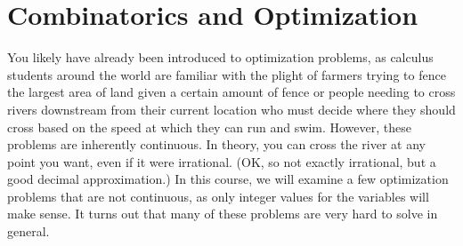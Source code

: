 \section{Combinatorics and Optimization}\label{s:intro:opt}

You likely have already been introduced to optimization problems, as
calculus students around the world are familiar with the plight of
farmers trying to fence the largest area of land given a certain
amount of fence or people needing to cross rivers downstream from
their current location who must decide where they should cross based
on the speed at which they can run and swim. However, these problems
are inherently continuous. In theory, you can cross the river at any
point you want, even if it were irrational. (OK, so not exactly
irrational, but a good decimal approximation.) In this course, we will
examine a few optimization problems that are not continuous, as only
integer values for the variables will make sense. It turns out that
many of these problems are very hard to solve in general.

